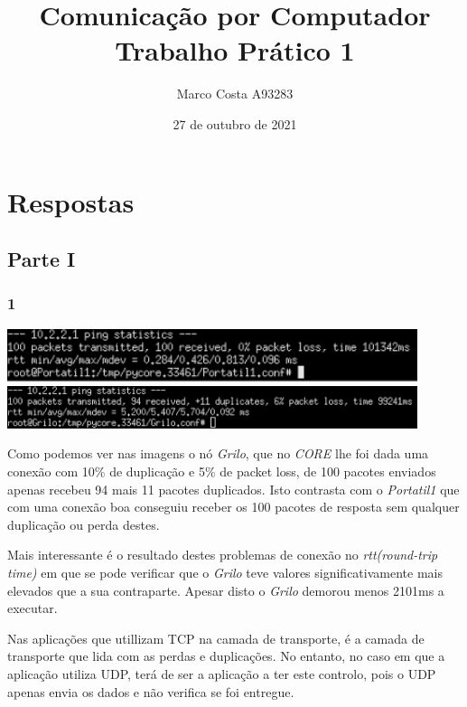 \documentclass{article}
\title{
    Comunicação por Computador \\
    \large{Trabalho Prático 1}
}
\author{
    Marco Costa A93283
}
\date{27 de outubro de 2021}
\affil{
    Universidade do Minho
}
\begin{document}
        \maketitle
    \section*{Respostas}
        \subsection*{Parte I}
            \subsubsection*{1}
                {
                    \centering
                    \includegraphics[width=12cm]{images/ping-portatil.png}
                    \includegraphics[width=12cm]{images/ping-grilo.png}
                    \par
                }
                    Como podemos ver nas imagens o nó \textit{Grilo}, que no \textit{CORE} lhe foi dada
                uma conexão com 10\% de duplicação e 5\% de packet loss, de 100 pacotes enviados apenas recebeu
                94 mais 11 pacotes duplicados. Isto contrasta com o \textit{Portatil1} que com uma conexão boa conseguiu
                receber os 100 pacotes de resposta sem qualquer duplicação ou perda destes.\par

                    Mais interessante é o resultado destes problemas de conexão no \textit{rtt(round-trip time)} em que se pode verificar
                que o \textit{Grilo} teve valores significativamente mais elevados que a sua contraparte. Apesar disto o \textit{Grilo} demorou
                menos 2101ms a executar.

		Nas aplicações que utillizam TCP na camada de transporte, é a camada de transporte que lida com as perdas e duplicações. No entanto, no caso em que a aplicação utiliza UDP, terá de ser a aplicação a ter este controlo, pois o UDP apenas envia os dados e não verifica se foi entregue.
\end{document}
